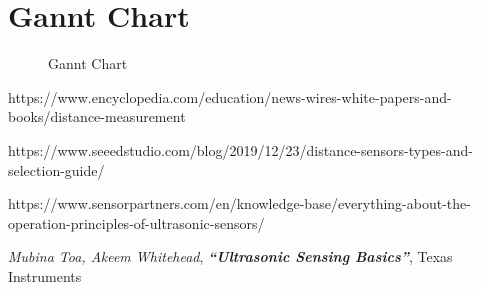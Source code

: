 \documentclass[12pt, a4paper]{article}
\begin{document}
     \pagebreak
    \section{Gannt Chart}

        \begin{figure}[H]\centering
                \caption{Gannt Chart}
        \end{figure}



    


    \begin{thebibliography}{}	
        https://www.encyclopedia.com/education/news-wires-white-papers-and-books/distance-measurement

        https://www.seeedstudio.com/blog/2019/12/23/distance-sensors-types-and-selection-guide/

        https://www.sensorpartners.com/en/knowledge-base/everything-about-the-operation-principles-of-ultrasonic-sensors/ 
        
        \bibitem{}
        \textit{Mubina Toa, Akeem Whitehead}, \textbf{\textit{``Ultrasonic Sensing Basics''}}, Texas Instruments
    \end{thebibliography}
            
\end{document}
